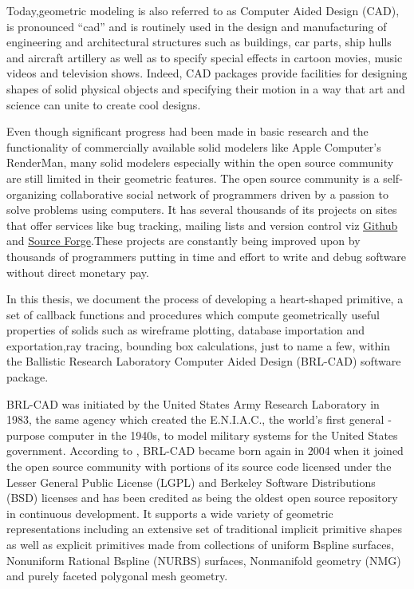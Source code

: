 \hspace{30} Today,geometric modeling is also referred to as Computer ­Aided Design
(CAD), is pronounced “cad” and is routinely used in the design and
manufacturing of engineering and architectural structures such as buildings, car  
parts, ship hulls and aircraft artillery as well as to specify special effects in  
cartoon movies, music videos and television shows. Indeed, CAD packages
provide facilities for designing shapes of solid physical objects and specifying
their motion in a way that art and science can unite to create cool designs.  

\hspace{30} Even though significant progress had been made in basic research and
the functionality of commercially available solid modelers like Apple
Computer's RenderMan, many solid modelers especially within the open
source community are still limited in their geometric features. The open
source community is a self­organizing collaborative social network of 
programmers driven by a passion to solve problems using computers.
It has several thousands of its projects on sites that offer services 
like bug tracking, mailing lists and version control viz \href{https://github.com/}{Github} 
and \href{http://sourceforge.net}{Source Forge}.These projects are constantly 
being improved upon by thousands of programmers putting in time and effort 
to write and debug software without direct monetary pay.

\hspace{30} In this thesis, we document the process of developing a heart­-shaped
primitive, a set of callback functions and procedures which compute geometrically 
useful properties of solids such as wireframe plotting, database importation and 
exportation,ray tracing, bounding box calculations, just to name a few, within the
 Ballistic Research Laboratory Computer Aided Design (BRL-­CAD) software package.  

\hspace{30} BRL-­CAD was initiated by the United States Army Research Laboratory
in 1983, the same agency which created the E.N.I.A.C., the world's first 
general ­purpose computer in the 1940s, to model military systems for the
United States government. According to \cite{3}, BRL-­CAD became born again in 
2004 when it joined the open source community with portions of its source
code licensed under the Lesser General Public License (LGPL) and Berkeley
Software Distributions (BSD) licenses and has been credited as being the
oldest open source repository in continuous development. It supports a wide
variety of geometric representations including an extensive set of traditional
implicit primitive shapes as well as explicit primitives made from collections of
uniform B­spline surfaces, Non­uniform Rational B­spline (NURBS) surfaces,  
Non­manifold geometry (NMG) and purely faceted polygonal mesh geometry.  

